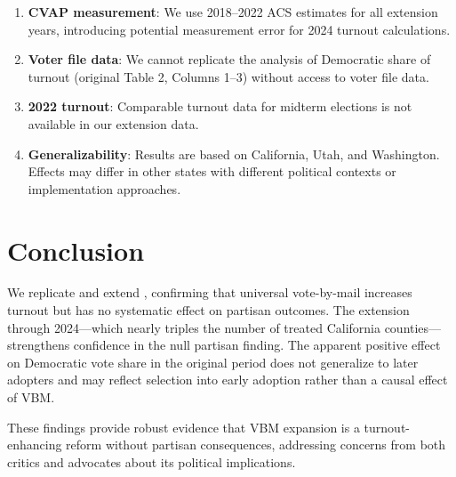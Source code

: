 \documentclass[12pt]{article}
\begin{document}
\begin{enumerate}
    \item \textbf{CVAP measurement}: We use 2018--2022 ACS estimates for all extension years, introducing potential measurement error for 2024 turnout calculations.

    \item \textbf{Voter file data}: We cannot replicate the analysis of Democratic share of turnout (original Table 2, Columns 1--3) without access to voter file data.

    \item \textbf{2022 turnout}: Comparable turnout data for midterm elections is not available in our extension data.

    \item \textbf{Generalizability}: Results are based on California, Utah, and Washington. Effects may differ in other states with different political contexts or implementation approaches.
\end{enumerate}

\section{Conclusion}

We replicate and extend \citet{thompson2020universal}, confirming that universal vote-by-mail increases turnout but has no systematic effect on partisan outcomes. The extension through 2024---which nearly triples the number of treated California counties---strengthens confidence in the null partisan finding. The apparent positive effect on Democratic vote share in the original period does not generalize to later adopters and may reflect selection into early adoption rather than a causal effect of VBM.

These findings provide robust evidence that VBM expansion is a turnout-enhancing reform without partisan consequences, addressing concerns from both critics and advocates about its political implications.

\newpage
\end{document}

